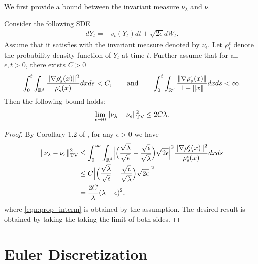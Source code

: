 We first provide a bound between the invariant measure $\nu_\lambda$ and $\nu$.

\begin{prop}
\label{prop:dist_statmeas}
Consider the following SDE
\begin{align}
d Y_t = - v_t(Y_t) dt + \sqrt{2 \epsilon } d W_t. \label{eqn:sde_eps}
\end{align}
Assume that it satisfies  with the invariant measure denoted by $\nu_\epsilon$. Let $\rho^\epsilon_t$ denote the probability density function of $Y_t$ at time $t$. Further assume that for all $\epsilon,t>0$, there exists $C >0$  
\begin{align}
\int_{0}^t \int_{\mathbb{R}^d} \frac{\|\nabla \rho^\epsilon_s(x) \|^2}{\rho^\epsilon_s(x)} dx ds <C, \qquad \text{and} \qquad \int_{0}^t \int_{\mathbb{R}^d}  \frac{\|\nabla \rho^\epsilon_s(x)\|}{1+\|x\|} dx ds <\infty.
\end{align}
Then the following bound holds:
\begin{align}
\lim_{\epsilon \rightarrow 0} \| \nu_\lambda - \nu_\epsilon \|_{\textnormal{TV}}^2 \leq 2 C \lambda.
\end{align}
\end{prop}
%
\begin{proof}
By Corollary 1.2 of \cite{bogachev2016distances}, for any $\epsilon > 0$ we have 
\begin{align}
\| \nu_\lambda - \nu_\epsilon \|_{\textnormal{TV}}^2 &\leq \int_0^\infty \int_{\mathbb{R}^d} \Bigl| \Bigl(\frac{\sqrt{\lambda}}{\sqrt{\epsilon}}- \frac{\sqrt{\epsilon}}{\sqrt{\lambda}} \Bigr) \sqrt{2\epsilon}  \Bigr|^2 \frac{\|\nabla \rho^\epsilon_s(x)\|^2}{\rho^\epsilon_s(x)}  dx ds \\
&\leq  C \Bigl| \Bigl(\frac{\sqrt{\lambda}}{\sqrt{\epsilon}}- \frac{\sqrt{\epsilon}}{\sqrt{\lambda}} \Bigr) \sqrt{2\epsilon}  \Bigr|^2 \label{eqn:prop_interm} \\
&= \frac{2C}{\lambda} (\lambda - \epsilon)^2,
\end{align}
where \eqref{eqn:prop_interm} is obtained by the assumption. The desired result is obtained by taking the taking the limit of both sides. 
\end{proof}
%



\section{Euler Discretization}


